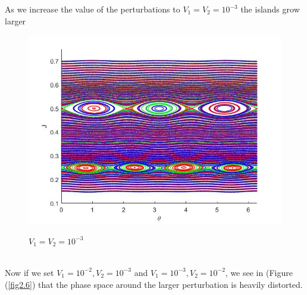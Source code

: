 %
As we increase the value of the perturbations to $V_1=V_2=10^{-3}$ the islands grow larger 
	\begin{figure}[h!]
		\centering
		\includegraphics[scale=0.5]{Hamiltonian_1/numerical/figs/Q5_1e-3.1e-3_3634}
		\label{fig2.5}
		\caption{$V_1=V_2=10^{-3}$}
	\end{figure}\\
	Now if we set $V_1=10^{-2}, V_2=10^{-3}$ and $V_1=10^{-3},V_2=10^{-2}$, we see in (Figure (\ref{fig2.6}) that the phase space around the larger perturbation is heavily distorted. 
